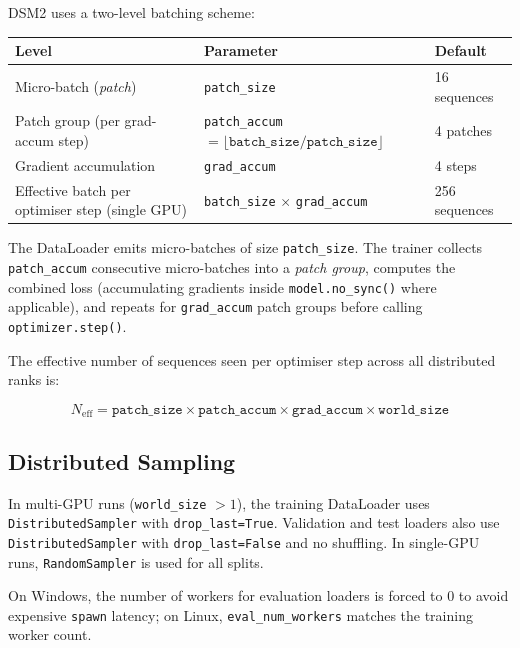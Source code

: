 \documentclass[11pt,a4paper]{article}
\begin{document}
DSM2 uses a two-level batching scheme:

\begin{center}
\begin{tabular}{lll}
\toprule
\textbf{Level} & \textbf{Parameter} & \textbf{Default} \\
\midrule
Micro-batch (\emph{patch}) & \texttt{patch\_size} & 16 sequences \\
Patch group (per grad-accum step) & \texttt{patch\_accum} $= \lfloor\texttt{batch\_size}/\texttt{patch\_size}\rfloor$ & 4 patches \\
Gradient accumulation & \texttt{grad\_accum} & 4 steps \\
\midrule
Effective batch per optimiser step (single GPU) & \texttt{batch\_size} $\times$ \texttt{grad\_accum} & 256 sequences \\
\bottomrule
\end{tabular}
\end{center}

The DataLoader emits micro-batches of size \texttt{patch\_size}.  The trainer collects
\texttt{patch\_accum} consecutive micro-batches into a \emph{patch group}, computes the combined
loss (accumulating gradients inside \texttt{model.no\_sync()} where applicable), and repeats for
\texttt{grad\_accum} patch groups before calling \texttt{optimizer.step()}.

The effective number of sequences seen per optimiser step across all distributed ranks is:

\begin{equation}
  N_{\mathrm{eff}} = \texttt{patch\_size} \times \texttt{patch\_accum} \times \texttt{grad\_accum} \times \texttt{world\_size}
\end{equation}

\subsection{Distributed Sampling}

In multi-GPU runs (\texttt{world\_size} $> 1$), the training DataLoader uses
\texttt{DistributedSampler} with \texttt{drop\_last=True}.  Validation and test loaders also use
\texttt{DistributedSampler} with \texttt{drop\_last=False} and no shuffling.  In single-GPU runs,
\texttt{RandomSampler} is used for all splits.

On Windows, the number of workers for evaluation loaders is forced to 0 to avoid expensive
\texttt{spawn} latency; on Linux, \texttt{eval\_num\_workers} matches the training worker count.
\end{document}

